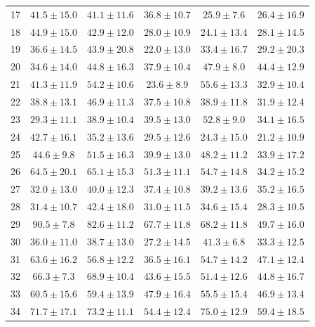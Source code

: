 \begin{tabular}{lccccc}
17 & $\mathbf{41.5} \pm 15.0$ & $41.1 \pm 11.6$ & $36.8 \pm 10.7$ & $25.9 \pm 7.6$ & $26.4 \pm 16.9$ \\
18 & $\mathbf{44.9} \pm 15.0$ & $42.9 \pm 12.0$ & $28.0 \pm 10.9$ & $24.1 \pm 13.4$ & $28.1 \pm 14.5$ \\
19 & $36.6 \pm 14.5$ & $\mathbf{43.9} \pm 20.8$ & $22.0 \pm 13.0$ & $33.4 \pm 16.7$ & $29.2 \pm 20.3$ \\
20 & $34.6 \pm 14.0$ & $44.8 \pm 16.3$ & $37.9 \pm 10.4$ & $\mathbf{47.9} \pm 8.0$ & $44.4 \pm 12.9$ \\
21 & $41.3 \pm 11.9$ & $54.2 \pm 10.6$ & $23.6 \pm 8.9$ & $\mathbf{55.6} \pm 13.3$ & $32.9 \pm 10.4$ \\
22 & $38.8 \pm 13.1$ & $\mathbf{46.9} \pm 11.3$ & $37.5 \pm 10.8$ & $38.9 \pm 11.8$ & $31.9 \pm 12.4$ \\
23 & $29.3 \pm 11.1$ & $38.9 \pm 10.4$ & $39.5 \pm 13.0$ & $\mathbf{52.8} \pm 9.0$ & $34.1 \pm 16.5$ \\
24 & $\mathbf{42.7} \pm 16.1$ & $35.2 \pm 13.6$ & $29.5 \pm 12.6$ & $24.3 \pm 15.0$ & $21.2 \pm 10.9$ \\
25 & $44.6 \pm 9.8$ & $\mathbf{51.5} \pm 16.3$ & $39.9 \pm 13.0$ & $48.2 \pm 11.2$ & $33.9 \pm 17.2$ \\
26 & $64.5 \pm 20.1$ & $\mathbf{65.1} \pm 15.3$ & $51.3 \pm 11.1$ & $54.7 \pm 14.8$ & $34.2 \pm 15.2$ \\
27 & $32.0 \pm 13.0$ & $\mathbf{40.0} \pm 12.3$ & $37.4 \pm 10.8$ & $39.2 \pm 13.6$ & $35.2 \pm 16.5$ \\
28 & $31.4 \pm 10.7$ & $\mathbf{42.4} \pm 18.0$ & $31.0 \pm 11.5$ & $34.6 \pm 15.4$ & $28.3 \pm 10.5$ \\
29 & $\mathbf{90.5} \pm 7.8$ & $82.6 \pm 11.2$ & $67.7 \pm 11.8$ & $68.2 \pm 11.8$ & $49.7 \pm 16.0$ \\
30 & $36.0 \pm 11.0$ & $38.7 \pm 13.0$ & $27.2 \pm 14.5$ & $\mathbf{41.3} \pm 6.8$ & $33.3 \pm 12.5$ \\
31 & $\mathbf{63.6} \pm 16.2$ & $56.8 \pm 12.2$ & $36.5 \pm 16.1$ & $54.7 \pm 14.2$ & $47.1 \pm 12.4$ \\
32 & $66.3 \pm 7.3$ & $\mathbf{68.9} \pm 10.4$ & $43.6 \pm 15.5$ & $51.4 \pm 12.6$ & $44.8 \pm 16.7$ \\
33 & $\mathbf{60.5} \pm 15.6$ & $59.4 \pm 13.9$ & $47.9 \pm 16.4$ & $55.5 \pm 15.4$ & $46.9 \pm 13.4$ \\
34 & $71.7 \pm 17.1$ & $73.2 \pm 11.1$ & $54.4 \pm 12.4$ & $\mathbf{75.0} \pm 12.9$ & $59.4 \pm 18.5$ \\

\end{tabular}

